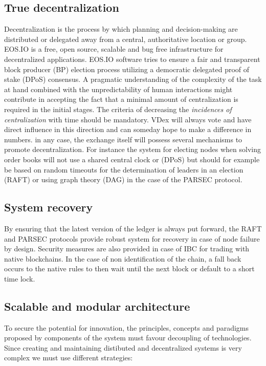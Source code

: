 \documentclass[]{article}
\begin{document}
	\subsection{True decentralization}
	 Decentralization is the process by which planning and decision-making are distributed or delegated away from a central, authoritative location or group.
	 EOS.IO is a free, open source, scalable and bug free infrastructure for decentralized applications. EOS.IO software tries to ensure a fair and transparent block producer (BP) election process utilizing a democratic delegated proof of stake (DPoS) consensus.
	 A pragmatic understanding of the complexity of the task at hand combined with the unpredictability of human interactions might contribute in accepting the fact that a minimal amount of centralization is required in the initial stages.
	 The criteria of decreasing the \textit{incidences of centralization} with time should be mandatory. VDex will always vote and have direct influence in this direction and can someday hope to make a difference in numbers.
	 in any case, the exchange itself will possess several mechanisms to promote decentralization. For instance the system for electing nodes when solving order books will not use a shared central clock or (DPoS) but should for example be based on random timeouts for the determination of leaders in an election (RAFT) or using graph theory (DAG) in the case of the PARSEC protocol.
	 
	\subsection{System recovery}
	By ensuring that the latest version of the ledger is always put forward, 
	the RAFT and PARSEC protocols provide robust system for recovery in case of node failure by design.
	Security measures are also provided in case of IBC for trading with native blockchains. In the case of non identification of the chain, a fall back occurs to the native rules to then  wait until the next block or default to a short time lock.
	
	\subsection{Scalable and modular architecture}
	To secure the potential for innovation, the principles, 
	concepts and paradigms proposed by components of the system
	must favour decoupling of technologies. 
	Since creating and maintaining distibuted and decentralized systems
	is very complex we must use different strategies: 
\end{document}
